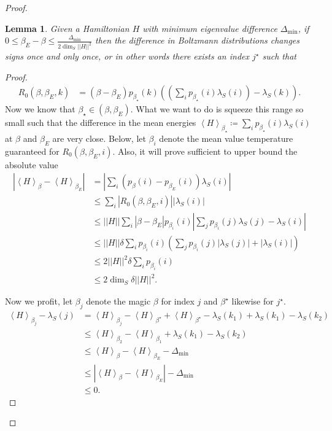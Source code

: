 \documentclass{article}
\newtheorem{lemma}[theorem]{Lemma}
\newcommand{\parens}[1]{\left( #1 \right)}
\newcommand{\abs}[1]{\left| #1 \right|}
\newcommand{\norm}[1]{\left| \left| #1 \right| \right|}
\newcommand{\anglebrackets}[1]{\left< #1 \right>}
\newcommand{\partfun}{\mathcal{Z}}
\begin{document}
\begin{proof}
\begin{lemma} \label{lem:magic_index}
    Given a Hamiltonian $H$ with minimum eigenvalue difference $\Delta_{\min}$, if $0 \le \beta_E - \beta \le \frac{\Delta_{\min}}{2 \dim_S \norm{H}^2}$ then the difference in Boltzmann distributions changes signs once and only once, or in other words there exists an index $j^\star$ such that
\end{lemma}
\begin{proof}
\begin{align}
    R_0(\beta, \beta_E, k) &= (\beta - \beta_E) p_{\beta_{\star}}(k) \parens{\parens{\sum_i p_{\beta_{\star}}(i) \lambda_S(i)} - \lambda_S(k)}.
\end{align}
Now we know that $\beta_{\star} \in (\beta, \beta_E)$. What we want to do is squeeze this range so small such that the difference in the mean energies $\anglebrackets{H}_{\beta_{\star}} \coloneqq \sum_i p_{\beta_{\star}}(i) \lambda_S(i)$ at $\beta$ and $\beta_E$ are very close. Below, let $\beta_i$ denote the mean value temperature guaranteed for $R_0(\beta, \beta_E, i)$. Also, it will prove sufficient to upper bound the absolute value
\begin{align}
    \abs{\anglebrackets{H}_{\beta} - \anglebrackets{H}_{\beta_E}} &= \left| \sum_i (p_{\beta}(i) - p_{\beta_E}(i)) \lambda_S(i) \right| \\
    &\leq \sum_i \abs{R_0(\beta, \beta_E, i)} \abs{\lambda_S(i)} \\
    &\leq \norm{H} \sum_i |\beta - \beta_E| p_{\beta_i}(i) \abs{\sum_j p_{\beta_i}(j) \lambda_S(j) - \lambda_S(i)} \\
    &\leq \norm{H} \delta \sum_i p_{\beta_i}(i) \parens{\sum_{j} p_{\beta_i}(j) \abs{\lambda_S(j)} + \abs{\lambda_S(i)}} \\
    &\leq 2 \norm{H}^2 \delta \sum_i p_{\beta_i}(i) \\
    &\leq 2 \dim_S \delta \norm{H}^2.
\end{align}

Now we profit, let $\beta_j$ denote the magic $\beta$ for index $j$ and $\beta^\star$ likewise for $j^\star$. 
\begin{align}
    \anglebrackets{H}_{\beta_j} - \lambda_S(j) &= \anglebrackets{H}_{\beta_j} - \anglebrackets{H}_{\beta^\star} + \anglebrackets{H}_{\beta^\star} - \lambda_S(k_1) + \lambda_S(k_1) - \lambda_S(k_2) \\
    &\leq \anglebrackets{H}_{\beta_2} - \anglebrackets{H}_{\beta_1} + \lambda_S(k_1) - \lambda_S(k_2) \\
    &\leq \anglebrackets{H}_{\beta} - \anglebrackets{H}_{\beta_E} - \Delta_{\min} \\
    &\leq \abs{\anglebrackets{H}_{\beta} - \anglebrackets{H}_{\beta_E}} - \Delta_{\min} \\
    &\leq 0.
\end{align}


\end{proof}
\end{proof}
\end{document}
